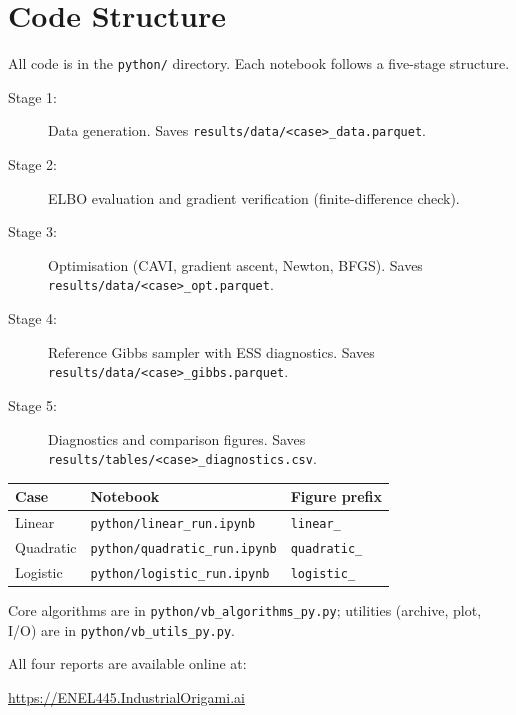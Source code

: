 \documentclass[11pt,a4paper]{article}
\begin{document}
\section{Code Structure}
\label{app:code}

All code is in the \texttt{python/} directory.
Each notebook follows a five-stage structure.

\begin{description}
  \item[Stage 1:] Data generation. Saves \texttt{results/data/<case>\_data.parquet}.
  \item[Stage 2:] ELBO evaluation and gradient verification (finite-difference check).
  \item[Stage 3:] Optimisation (CAVI, gradient ascent, Newton, BFGS).
    Saves \texttt{results/data/<case>\_opt.parquet}.
  \item[Stage 4:] Reference Gibbs sampler with ESS diagnostics.
    Saves \texttt{results/data/<case>\_gibbs.parquet}.
  \item[Stage 5:] Diagnostics and comparison figures.
    Saves \texttt{results/tables/<case>\_diagnostics.csv}.
\end{description}

\begin{center}
\begin{tabular}{@{}lll@{}}
\toprule
Case & Notebook & Figure prefix \\
\midrule
Linear     & \texttt{python/linear\_run.ipynb}     & \texttt{linear\_} \\
Quadratic  & \texttt{python/quadratic\_run.ipynb}  & \texttt{quadratic\_} \\
Logistic   & \texttt{python/logistic\_run.ipynb}   & \texttt{logistic\_} \\
\bottomrule
\end{tabular}
\end{center}

Core algorithms are in \texttt{python/vb\_algorithms\_py.py};
utilities (archive, plot, I/O) are in \texttt{python/vb\_utils\_py.py}.

All four reports are available online at:
\begin{center}
  \url{https://ENEL445.IndustrialOrigami.ai}
\end{center}
\end{document}
